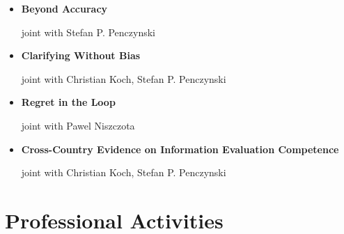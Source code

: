 \documentclass[letterpaper,11pt]{article}
\begin{document}
\begin{itemize}[leftmargin=0.15in, label=\textbullet, itemsep=5pt]

    \item[] \begin{minipage}{\linewidth}
    {\small{\textbf{Beyond Accuracy}}}
    \par{\footnotesize{joint with Stefan P. Penczynski}\par}
    \end{minipage}

    \vspace{0.2cm}

    \item[] \begin{minipage}{\linewidth}
    {\small{\textbf{Clarifying Without Bias}}}
    \par{\footnotesize{joint with Christian Koch, Stefan P. Penczynski}\par}
    \end{minipage}

    \vspace{0.2cm}

    \item[] \begin{minipage}{\linewidth}
    {\small{\textbf{Regret in the Loop}}}
    \par{\footnotesize{joint with Pawel Niszczota}\par}
    \end{minipage}

    \vspace{0.2cm}

    \item[] \begin{minipage}{\linewidth}
    {\small{\textbf{Cross-Country Evidence on Information Evaluation Competence}}}
    \par{\footnotesize{joint with Christian Koch, Stefan P. Penczynski}\par}
    \end{minipage}

\end{itemize}

\vspace{0.25cm}


\section{Professional Activities}
\end{document}
